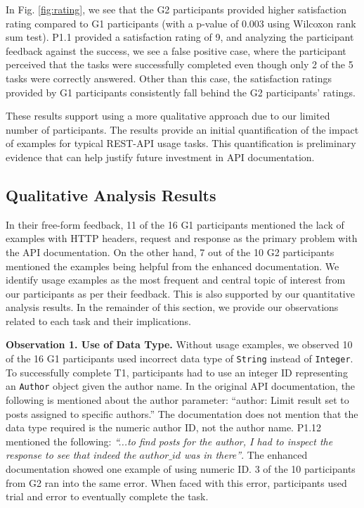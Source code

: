 \documentclass[conference]{IEEEtran}
\begin{document}
In Fig. \ref{fig:rating}, we see that the G2 participants provided higher satisfaction rating compared to G1 participants (with a p-value of 0.003 using Wilcoxon rank sum test). P1.1 provided a satisfaction rating of 9, and analyzing the participant feedback against the success, we see a false positive case, where the participant perceived that the tasks were successfully completed even though only 2 of the 5 tasks were correctly answered. Other than this case, the satisfaction ratings provided by G1 participants consistently fall behind the G2 participants' ratings.

These results support using a more qualitative approach due to our limited number of participants. The results provide an initial quantification of the impact of examples for typical REST-API usage tasks. This quantification is preliminary evidence that can help justify future investment in API documentation.


\subsection{Qualitative Analysis Results} %

In their free-form feedback, 11 of the 16 G1 participants mentioned the lack of examples with HTTP headers, request and response as the primary problem with the API documentation. On the other hand, 7 out of the 10 G2 participants mentioned the examples being helpful from the enhanced documentation. We identify usage examples as the most frequent and central topic of interest from our participants as per their feedback. This is also supported by our quantitative analysis results. In the remainder of this section, we provide our observations related to each task and their implications.


\textbf{Observation 1. Use of Data Type.} Without usage examples, we observed 10 of the 16 G1 participants used incorrect data type of \lstinline{String} instead of \lstinline{Integer}. To successfully complete T1, participants had to use an integer ID representing an \lstinline{Author} object given the author name. In the original API documentation, the following is mentioned about the author parameter: ``author: Limit result set to posts assigned to specific authors.'' The documentation does not mention that the data type required is the numeric author ID, not the author name. P1.12 mentioned the following: \textit{``...to find posts for the author, I had to inspect the response to see that indeed the $author\_id$ was in there''}. The enhanced documentation showed one example of using numeric ID. 3 of the 10 participants from G2 ran into the same error. When faced with this error, participants used trial and error to eventually complete the task.
\end{document}
